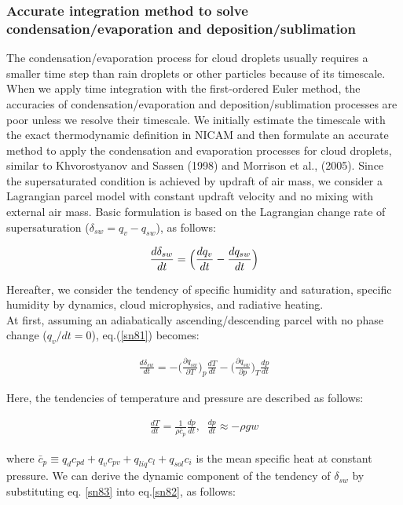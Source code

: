 \subsubsection{Accurate integration method to solve condensation/evaporation and deposition/sublimation}
The condensation/evaporation process for cloud droplets usually requires a smaller time step than rain droplets or other particles because of its timescale. When we apply time integration with the first-ordered Euler method, the accuracies of condensation/evaporation and deposition/sublimation processes are poor unless we resolve their timescale. We initially estimate the timescale with the exact thermodynamic definition in NICAM and then formulate an accurate method to apply the condensation and evaporation processes for cloud droplets, similar to Khvorostyanov and Sassen (1998) and Morrison et al., (2005). Since the supersaturated condition is achieved by updraft of air mass, we consider a Lagrangian parcel model with constant updraft velocity and no mixing with external air mass. Basic formulation is based on the Lagrangian change rate of supersaturation ($\delta_{sw} = q_{v} - q_{sw}$), as follows:

\begin{eqnarray}
\frac{d \delta_{sw}}{dt}=\Bigl(\frac{dq_{v}}{dt}-\frac{dq_{sw}}{dt}\Bigr)\label{sn81}
\end{eqnarray}

Hereafter, we consider the tendency of specific humidity and saturation, specific humidity by dynamics, cloud microphysics, and radiative heating.\\
At first, assuming an adiabatically ascending/descending parcel with no phase change ($q_{v}/dt = 0$), eq.(\ref{sn81}) becomes:

\begin{eqnarray}
\frac{d\delta_{sw}}{dt}=-\bigl(\frac{\partial q_{sw}}{\partial T}\bigr)_{p}\frac{dT}{dt}-\bigl(\frac{\partial q_{sw}}{\partial p}\bigr)_{T}\frac{dp}{dt}\label{sn82}
\end{eqnarray}

Here, the tendencies of temperature and pressure are described as follows:

\begin{eqnarray}
\frac{dT}{dt}=\frac{1}{\rho\bar{c}_{p}}\frac{dp}{dt},\;\;\frac{dp}{dt}\approx-\rho g w\label{sn83}
\end{eqnarray}

where $\bar{c}_{p}\equiv q_{d}c_{pd}+q_{v}c_{pv}+q_{liq}c_{l}+q_{sol}c_{i}$ is the mean specific heat at constant pressure. We can derive the dynamic component of the tendency of $\delta_{sw}$ by substituting eq. \ref{sn83} into eq.\ref{sn82}, as follows:

